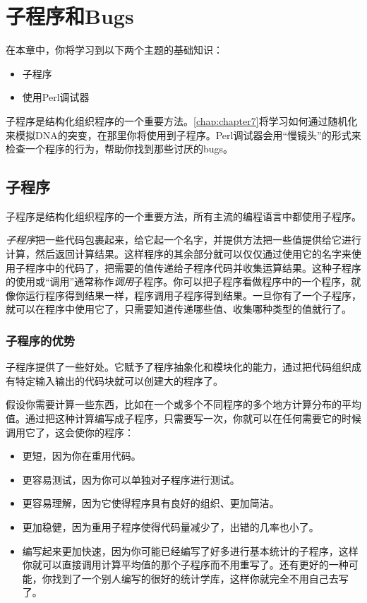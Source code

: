 \chapter{子程序和Bugs}
\label{chap:chapter6}
\minitoc

在本章中，你将学习到以下两个主题的基础知识：

\begin{itemize}
  \item 子程序
  \item 使用Perl调试器
\end{itemize}

子程序是结构化组织程序的一个重要方法。\autoref{chap:chapter7}将学习如何通过随机化来模拟DNA的突变，在那里你将使用到子程序。Perl调试器会用“慢镜头”的形式来检查一个程序的行为，帮助你找到那些讨厌的bugs。

\section{子程序}
子程序是结构化组织程序的一个重要方法，所有主流的编程语言中都使用子程序。

\textit{子程序}把一些代码包裹起来，给它起一个名字，并提供方法把一些值提供给它进行计算，然后返回计算结果。这样程序的其余部分就可以仅仅通过使用它的名字来使用子程序中的代码了，把需要的值传递给子程序代码并收集运算结果。这种子程序的使用或“调用”通常称作\textit{调用}子程序。你可以把子程序看做程序中的一个程序，就像你运行程序得到结果一样，程序调用子程序得到结果。一旦你有了一个子程序，就可以在程序中使用它了，只需要知道传递哪些值、收集哪种类型的值就行了。

\subsection{子程序的优势}
子程序提供了一些好处。它赋予了程序抽象化和模块化的能力，通过把代码组织成有特定输入输出的代码块就可以创建大的程序了。

假设你需要计算一些东西，比如在一个或多个不同程序的多个地方计算分布的平均值。通过把这种计算编写成子程序，只需要写一次，你就可以在任何需要它的时候调用它了，这会使你的程序：

\begin{itemize}
  \item 更短，因为你在重用代码。
  \item 更容易测试，因为你可以单独对子程序进行测试。
  \item 更容易理解，因为它使得程序具有良好的组织、更加简洁。
  \item 更加稳健，因为重用子程序使得代码量减少了，出错的几率也小了。
  \item 编写起来更加快速，因为你可能已经编写了好多进行基本统计的子程序，这样你就可以直接调用计算平均值的那个子程序而不用重写了。还有更好的一种可能，你找到了一个别人编写的很好的统计学库，这样你就完全不用自己去写了。
\end{itemize}


